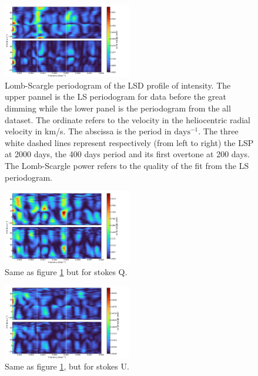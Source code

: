 \documentclass{aa}
\begin{document}
\begin{figure}[!h]
    \centering
    \includegraphics[width=0.5\textwidth]{Lomb-Scargle Intensity.png}
    \caption{Lomb-Scargle periodogram of the LSD profile of intensity. 
    The upper pannel is the LS periodogram for data before the great dimming while the lower panel is the periodogram from the all dataset.
    The ordinate refers to the velocity in the heliocentric radial velocity in km/s. The abscissa is the period in $\mathrm{days^{-1}}$. 
    The three white dashed lines represent respectively (from left to right) the LSP at 2000 days, the 400 days period and its first overtone at 200 days. 
    The Lomb-Scargle power refers to the quality of the fit from the LS periodogram. }
    \label{LS intensity}
\end{figure}

\begin{figure}[!h]
    \centering
    \includegraphics[width=0.5\textwidth]{Lomb-Scargle Stokes Q.png}
    \caption{Same as figure \ref{LS intensity} but for stokes Q. }
    \label{LS Q}
\end{figure}

\begin{figure}[!h]
    \centering
    \includegraphics[width=0.5\textwidth]{Lomb-Scargle Stokes U.png}
    \caption{Same as figure \ref{LS intensity}, but for stokes U.}
    \label{LS U}
\end{figure}
\end{document}
